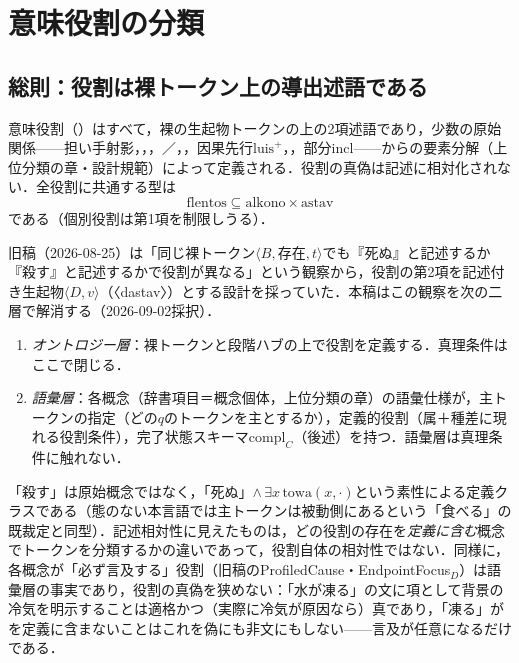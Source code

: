 \documentclass[../../main-detail.tex]{subfiles}
\begin{document}
\section{意味役割の分類}
\subsection{総則：役割は裸トークン上の導出述語である}
意味役割（）はすべて，裸の生起物トークンの上の2項述語であり，少数の原始関係——担い手射影，，，／，，因果先行$\mathrm{luis}^{+}$，，部分$\mathrm{incl}$——からの要素分解（上位分類の章・設計規範）によって定義される．役割の真偽は記述に相対化されない．全役割に共通する型は
\[
    \mathrm{flentos}\subseteq \mathrm{alkono}\times\mathrm{astav}
\]
である（個別役割は第1項を制限しうる）．

旧稿（2026-08-25）は「同じ裸トークン$\langle B,\text{存在},t\rangle$でも『死ぬ』と記述するか『殺す』と記述するかで役割が異なる」という観察から，役割の第2項を記述付き生起物$\langle D,v\rangle$（〈dastav〉）とする設計を採っていた．本稿はこの観察を次の二層で解消する（2026-09-02採択）．
\begin{enumerate}
    \item \emph{オントロジー層}：裸トークンと段階ハブの上で役割を定義する．真理条件はここで閉じる．
    \item \emph{語彙層}：各概念（辞書項目＝概念個体，上位分類の章）の語彙仕様が，主トークンの指定（どの$q$のトークンを主とするか），定義的役割（属＋種差に現れる役割条件），完了状態スキーマ$\mathrm{compl}_C$（後述）を持つ．語彙層は真理条件に触れない．
\end{enumerate}
「殺す」は原始概念ではなく，「死ぬ」$\land\,\exists x\,\mathrm{towa}(x,\cdot)$という素性による定義クラスである（態のない本言語では主トークンは被動側にあるという「食べる」の既裁定と同型）．記述相対性に見えたものは，どの役割の存在を\emph{定義に含む}概念でトークンを分類するかの違いであって，役割自体の相対性ではない．同様に，各概念が「必ず言及する」役割（旧稿のProfiledCause・EndpointFocus$_D$）は語彙層の事実であり，役割の真偽を狭めない：「水が凍る」の文に項として背景の冷気を明示することは適格かつ（実際に冷気が原因なら）真であり，「凍る」がを定義に含まないことはこれを偽にも非文にもしない——言及が任意になるだけである．
\end{document}
